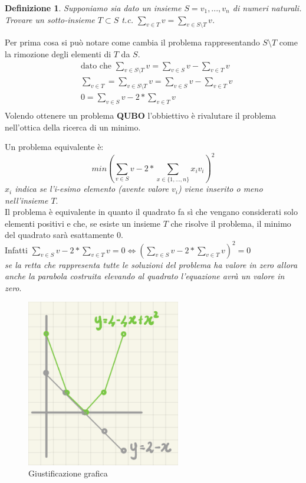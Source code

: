 \documentclass[a4paper]{article}
\newtheorem*{definition}{Definizione}
\begin{document}
\begin{definition}
	Supponiamo sia dato un insieme $S = {v_1 , . . . , v_n }$ di numeri naturali. Trovare un sotto-insieme $T \subset S$ t.c.  $\sum_{v\in T} v = \sum_{v \in S \setminus T}v $.
\end{definition}
Per prima cosa si può notare come cambia il problema rappresentando $S \setminus T$ come la rimozione degli elementi di $T$ da $S$.
\begin{align*}
	 &\text{dato che }\sum_{v \in S \setminus T}v = \sum_{v\in S} v - \sum_{v\in T} v \\
	 &\sum_{v\in T} = \sum_{v \in S \setminus T}v = \sum_{v\in S} v - \sum_{v\in T} v \\
	 &0 = \sum_{v\in S} v - 2 * \sum_{v\in T} v \\
\end{align*}
Volendo ottenere un problema \textbf{QUBO} l'obbiettivo è rivalutare il problema nell'ottica della ricerca di un minimo.

Un problema equivalente è: $$ min(\sum_{v\in S} v - 2 * \sum_{x \in \{1,...,n\}} x_iv_i)^2$$ \textit{$x_i$ indica se l'i-esimo elemento (avente valore $v_i$) viene inserito o meno nell'insieme $T$}.\\
Il problema è equivalente in quanto il quadrato fa sì che vengano considerati solo elementi positivi e che, se esiste un insieme $T$ che risolve il problema, il minimo del quadrato sarà esattamente 0.\\
Infatti $\sum_{v\in S} v - 2 * \sum_{v\in T} v = 0 \Leftrightarrow (\sum_{v\in S} v - 2 * \sum_{v\in T} v)^2=0$\\
\textit{se la retta che rappresenta tutte le soluzioni del problema ha valore in zero allora anche la parabola costruita elevando al quadrato l'equazione avrà un valore in zero}.
\begin{figure}[!ht]
                \centering
                \includegraphics[width = 0.6\textwidth]{./img/F1.png}
                \caption{Giustificazione grafica} \label{FIG:F1}
\end{figure}
\newpage
\restoregeometry
\end{document}
